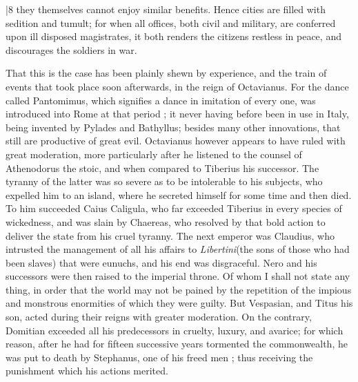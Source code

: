 |8 they themselves cannot enjoy similar benefits. Hence cities are filled with sedition and tumult; for when all offices, both civil and military, are conferred upon ill disposed magistrates, it both renders the citizens restless in peace, and discourages the soldiers in war.

That this is the case has been plainly shewn by experience, and the train of events that took place soon afterwards, in the reign of Octavianus. For the dance called Pantomimus, which signifies a dance in imitation of every one, was introduced into Rome at that period ; it never having before been in use in Italy, being invented by Pylades and Bathyllus; besides many other innovations, that still are productive of great evil. Octavianus however appears to have ruled with great moderation, more particularly after he listened to the counsel of Athenodorus the stoic, and when compared to Tiberius his successor. The tyranny of the latter was so severe as to be intolerable to his subjects, who expelled him to an island, where he secreted himself for some time and then died. To him succeeded Caius Caligula, who far exceeded Tiberius in every species of wickedness, and was slain by Chaereas, who resolved by that bold action to deliver the state from his cruel tyranny. The next emperor was Claudius, who intrusted the management of all his affairs to \emph{Libertini}(the sons of those who had been slaves) that were eunuchs, and his end was disgraceful. Nero and his successors were then raised to the imperial throne. Of whom I shall not state any thing, in order that the world may not be pained by the repetition of the impious and monstrous enormities of which they were guilty. But Vespasian, and Titus his son, acted during their reigns with greater moderation. On the contrary, Domitian exceeded all his predecessors in cruelty, luxury, and avarice; for which reason, after he had for fifteen successive years tormented the commonwealth, he was put to death by Stephanus, one of his freed men ; thus receiving the punishment which his actions merited.

